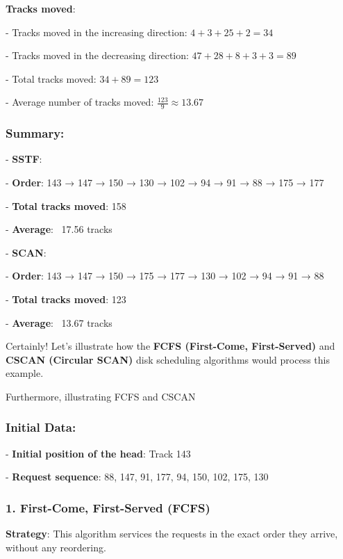 \documentclass[a4paper]{book}
\begin{document}
\textbf{Tracks moved}:

- Tracks moved in the increasing direction: \(4 + 3 + 25 + 2 = 34\)

- Tracks moved in the decreasing direction: \(47 + 28 + 8 + 3 + 3 = 89\)

- Total tracks moved: \(34 + 89 = 123\)

- Average number of tracks moved: \(\frac{123}{9} \approx 13.67\)


\subsubsection{\textbf{Summary}:}

- \textbf{SSTF}:

  
  - \textbf{Order}: 143 → 147 → 150 → 130 → 102 → 94 → 91 → 88 → 175 → 177

  - \textbf{Total tracks moved}: 158

  - \textbf{Average}: ~17.56 tracks


- \textbf{SCAN}:

  
  - \textbf{Order}: 143 → 147 → 150 → 175 → 177 → 130 → 102 → 94 → 91 → 88

  - \textbf{Total tracks moved}: 123

  - \textbf{Average}: ~13.67 tracks


Certainly! Let's illustrate how the \textbf{FCFS (First-Come, First-Served)} and \textbf{CSCAN (Circular SCAN)} disk scheduling algorithms would process this example.

\begin{greenbox}
Furthermore, illustrating FCFS and CSCAN
\end{greenbox}

\subsubsection{Initial Data:}

- \textbf{Initial position of the head}: Track 143

- \textbf{Request sequence}: 88, 147, 91, 177, 94, 150, 102, 175, 130


\subsubsection{1. \textbf{First-Come, First-Served (FCFS)}}

\textbf{Strategy}:
This algorithm services the requests in the exact order they arrive, without any reordering.
\end{document}
